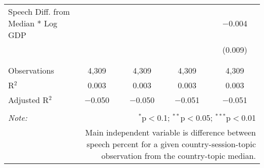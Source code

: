 \begin{table}[!htbp]
\begin{tabular}{@{\extracolsep{5pt}}lcccc}
 Speech Diff. from Median * Log GDP &  &  &  & $-$0.004 \\ 
  &  &  &  & (0.009) \\ 
  & & & & \\ 
\hline \\[-1.8ex] 
Observations & 4,309 & 4,309 & 4,309 & 4,309 \\ 
R$^{2}$ & 0.003 & 0.003 & 0.003 & 0.003 \\ 
Adjusted R$^{2}$ & $-$0.050 & $-$0.050 & $-$0.051 & $-$0.051 \\ 
\hline 
\hline \\[-1.8ex] 
\textit{Note:}  & \multicolumn{4}{r}{$^{*}$p$<$0.1; $^{**}$p$<$0.05; $^{***}$p$<$0.01} \\ 
 & \multicolumn{4}{r}{Main independent variable is difference between speech percent for a given country-session-topic observation from the country-topic median.} \\ 
\end{tabular} 
\end{table} 
